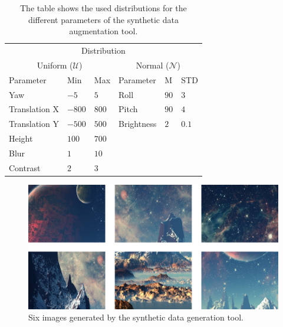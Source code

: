 \documentclass{report}
\begin{document}
\begin{table}[h!]
  \centering
  \begin{tabular}{llllll}
    \toprule
    \multicolumn{6}{c}{Distribution}                                                         \\
    \multicolumn{3}{c}{Uniform ($\mathcal{U}$)} & \multicolumn{3}{c}{Normal ($\mathcal{N}$)} \\
    \cmidrule(r){1-3}\cmidrule(r){4-6}
    Parameter                                   & Min   & Max   & Parameter  & M    & STD    \\
    \cmidrule(r){1-3}\cmidrule(r){4-6}
    Yaw                                         & $-5$   & $5$ & Roll       & $90$ & $3$    \\
    Translation X                               & $-800$ & $800$ & Pitch      & $90$ & $4$    \\
    Translation Y                               & $-500$ & $500$ & Brightness & $2$  & $0.1$  \\
    Height                                      & $100$ & $700$ &            &      &        \\
    Blur                                        & $1$   & $10$  &            &      &        \\
    Contrast                                    & $2$   & $3$   &            &      &        \\
    \bottomrule
  \end{tabular}
  \caption[Distributions for the different
  parameters of the synthetic data augmentation tool.]{The table shows the used distributions for the different
    parameters of the synthetic data augmentation tool.}
  \label{tab:distributions}

\end{table}

\begin{figure}[h!]
\begin{center}
\includegraphics[width=0.7\columnwidth]{samples}
\caption{{\label{fig:montage} 
Six images generated by the synthetic data generation tool.%
}}
\end{center}
\end{figure}
\end{document}
